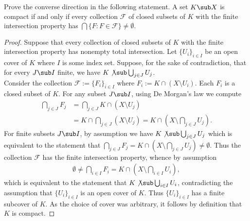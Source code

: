 \documentclass[12pt]{article}
\begin{document}
\begin{homeworkProblem}
  Prove the converse direction in the following statement. A set $ K\sub X $ is compact if and only if every collection $ \mathscr{F} $ of closed subsets of $ K $ with the finite intersection property has $ \bigcap \{F: F\in \mathscr{F}\} \neq \emptyset $.

\begin{proof}
  Suppose that every collection of closed subsets of $ K $ with the finite intersection property has nonempty total intersection. Let $ \{U_{i}\}_{i\in I} $ be an open cover of $ K $ where $ I $ is some index set. Suppose, for the sake of contradiction, that for every $ J\sub I $ finite, we have $ K \not \sub \bigcup_{j\in J}U_{j} $.\\

  Consider the collection $ \mathscr{F}:=\{F_{i}\}_{i\in I} $ where $ F_{i}:= K\cap (X\setminus U_{i}) $. Each $ F_{i} $ is a closed subset of $ K $. For any subset $ J\sub I $, using De Morgan's law we compute
  \begin{align*}
    \bigcap_{j\in J} F_{j} &= \bigcap_{j\in J} K\cap (X\setminus U_{j}) \\
    &= K\cap \bigcap_{j\in J} (X\setminus U_{j}) = K\cap \left(X\setminus \bigcap_{j\in J}U_{j} \right).
  \end{align*}
  For finite subsets $ J\sub I $, by assumption we have $ K\not\sub \bigcup_{j\in J}  U_{j}$ which is equivalent to the statement that $\bigcap_{j\in J}F_{j} = K\cap \left(X\setminus \bigcap_{j\in J}U_{j} \right)\neq \emptyset$. Thus the collection $ \mathscr{F} $ has the finite intersection property, whence by assumption
  \begin{align*}
    \emptyset \neq \bigcap_{i\in I} F_{i} = K\cap \left(X\setminus \bigcap_{i\in I}U_{i} \right),
  \end{align*}
  which is equivalent to the statement that $ K\not\sub\bigcup_{i\in I}U_{i} $, contradicting the assumption that $ \{U_{i}\}_{i\in I} $ is an open cover of $ K $. Thus $ \{U_{i}\}_{i\in I} $ has a finite subcover of $ K $. As the choice of cover was arbitrary, it follows by definition that $ K $ is compact.
\end{proof}
\end{homeworkProblem}
\end{document}
